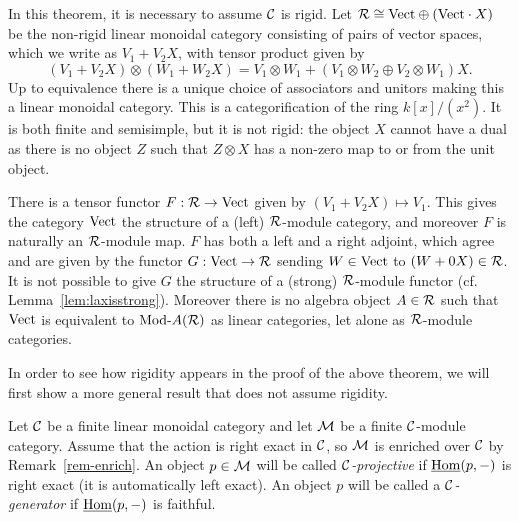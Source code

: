 \documentclass{amsart}
\begin{document}
\begin{example} \label{ex:lax-module}
	In this theorem, it is necessary to assume $\mathcal C$ is rigid.  Let $\mathcal R \cong \mathrm{Vect} \oplus (\mathrm{Vect} \cdot X)$ be the non-rigid linear monoidal category consisting of pairs of vector spaces, which we write as $V_1 + V_2 X$, with tensor product given by 
	\begin{equation*}
		(V_1 + V_2 X) \otimes (W_1 + W_2 X) = V_1 \otimes W_1  +  (V_1 \otimes W_2 \oplus V_2 \otimes W_1)X.
	\end{equation*} 
	Up to equivalence there is a unique choice of associators and unitors making this a linear monoidal category. 
This is a categorification of the ring $k[x]/(x^2)$.  It is both finite and semisimple, but it is not rigid: the object $X$ cannot have a dual as there is no object $Z$ such that $Z \otimes X$ has a non-zero map to or from the unit object. 
	
	There is a tensor functor $F:\mathcal R \to \mathrm{Vect}$ given by $(V_1 + V_2 X) \mapsto V_1$. This gives the category $\mathrm{Vect}$ the structure of a (left) $\mathcal R$-module category, and moreover $F$ is naturally an $\mathcal R$-module map. $F$ has both a left and a right adjoint, which agree and are given by the functor $G: \mathrm{Vect} \to \mathcal R$ sending $W \in \mathrm{Vect}$ to $(W + 0 X) \in \mathcal R$.   
	It is not possible to give $G$ the structure of a (strong) $\mathcal R$-module functor (cf. Lemma~\ref{lem:laxisstrong}). Moreover there is no algebra object $A \in \mathcal R$ such that $\mathrm{Vect}$ is equivalent to $\Mod{}{A}(\cR)$ as linear categories, let alone as $\mathcal R$-module categories.   
\end{example}

In order to see how rigidity appears in the proof of the above theorem, we will first show a more general result that does not assume rigidity.

\begin{definition}
	Let $\mathcal C$ be a finite linear monoidal category and let $\mathcal M$ be a finite $\mathcal C$-module category. Assume that the action is right exact in $\mathcal C$, so $\mathcal M$ is enriched over $\mathcal C$ by Remark~\ref{rem-enrich}. 
	An object $p \in \mathcal M$ will be called {\em $\mathcal C$-projective} if $\operatorname{\underline{Hom}}(p, -)$ is right exact (it is automatically left exact). An object $p$ will be called a {\em $\mathcal C$-generator} if $\operatorname{\underline{Hom}}(p,-)$ is faithful.
\end{definition}
\end{document}
